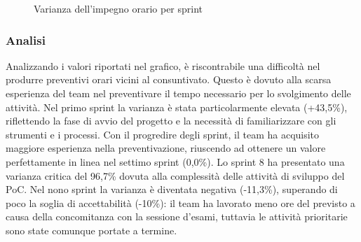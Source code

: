 \documentclass[a4paper,11pt,oneside]{scrartcl}
\begin{document}
\begin{figure}[H]
\centering
{}
\caption{Varianza dell'impegno orario per sprint}
\label{fig:varianza_ore}
\end{figure}

\subsubsection*{Analisi}

Analizzando i valori riportati nel grafico, è riscontrabile una difficoltà nel produrre preventivi orari vicini al consuntivato. Questo è dovuto alla scarsa esperienza del team nel preventivare il tempo necessario per lo svolgimento delle attività. Nel primo sprint la varianza è stata particolarmente elevata (+43,5\%), riflettendo la fase di avvio del progetto e la necessità di familiarizzare con gli strumenti e i processi. Con il progredire degli sprint, il team ha acquisito maggiore esperienza nella preventivazione, riuscendo ad ottenere un valore perfettamente in linea nel settimo sprint (0,0\%). Lo sprint 8 ha presentato una varianza critica del 96,7\% dovuta alla complessità delle attività di sviluppo del PoC. Nel nono sprint la varianza è diventata negativa (-11,3\%), superando di poco la soglia di accettabilità (-10\%): il team ha lavorato meno ore del previsto a causa della concomitanza con la sessione d'esami, tuttavia le attività prioritarie sono state comunque portate a termine.
\end{document}
